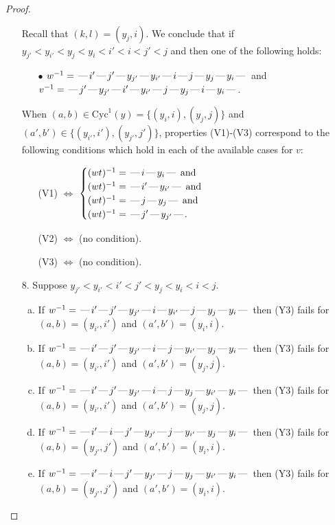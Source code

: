\documentclass[10pt]{article}
\theoremstyle{definition}
\theoremstyle{definition}
\def\dash{\text{\hspace{0.5mm}---\hspace{0.5mm}}}
\def\Cyc{\mathrm{Cyc}}
\begin{document}
\begin{proof}
\begin{enumerate}
\begin{enumerate}[(a)]
\end{enumerate}
Recall that $(k,l) = (y_j,i)$.
We conclude that if $y_{j'} < y_{i'} < y_j < y_i < i' < i < j' < j$ and then one of the following holds:
\begin{enumerate}
\item[$\bullet$] $w^{-1} = \dash i'\dash j'\dash y_{j'}\dash y_{i'}\dash i\dash j\dash y_j\dash y_i\dash $ and $v^{-1} = \dash j'\dash y_{j'}\dash i'\dash y_{i'}\dash j\dash y_j\dash i\dash y_i\dash $.
\end{enumerate}
When $(a,b)\in\Cyc^1(y)=\{(y_i,i),(y_j,j)\}$ and $(a',b')\in\{(y_{i'},i'),(y_{j'},j')\}$,
properties (V1)-(V3) correspond to the following conditions which hold in
each of the available cases for $v$:
\begin{enumerate}
\item[](V1) $\Leftrightarrow$ $\begin{cases}\text{$(wt)^{-1} = \dash i \dash y_i \dash$}\text{ and }\\
\text{$(wt)^{-1} = \dash i' \dash y_{i'} \dash$}\text{ and }\\
\text{$(wt)^{-1} = \dash j \dash y_j \dash$}\text{ and }\\
\text{$(wt)^{-1} = \dash j' \dash y_{j'} \dash$}.\end{cases}$
\item[](V2) $\Leftrightarrow$ (no condition).
\item[](V3) $\Leftrightarrow$ (no condition).
\end{enumerate}
\item[$8$.] Suppose $y_{j'} < y_{i'} < i' < j' < y_j < y_i < i < j$.
\begin{enumerate}[(a)]
\item If $w^{-1} = \dash i'\dash j'\dash y_{j'}\dash i\dash y_{i'}\dash j\dash y_j\dash y_i\dash $ then (Y3) fails for $(a,b)=(y_{i'},i')$ and $(a',b')=(y_i,i)$.
\item If $w^{-1} = \dash i'\dash j'\dash y_{j'}\dash i\dash j\dash y_{i'}\dash y_j\dash y_i\dash $ then (Y3) fails for $(a,b)=(y_{i'},i')$ and $(a',b')=(y_j,j)$.
\item If $w^{-1} = \dash i'\dash j'\dash y_{j'}\dash i\dash j\dash y_j\dash y_{i'}\dash y_i\dash $ then (Y3) fails for $(a,b)=(y_{i'},i')$ and $(a',b')=(y_j,j)$.
\item If $w^{-1} = \dash i'\dash i\dash j'\dash y_{j'}\dash j\dash y_{i'}\dash y_j\dash y_i\dash $ then (Y3) fails for $(a,b)=(y_{j'},j')$ and $(a',b')=(y_i,i)$.
\item If $w^{-1} = \dash i'\dash i\dash j'\dash y_{j'}\dash j\dash y_j\dash y_{i'}\dash y_i\dash $ then (Y3) fails for $(a,b)=(y_{j'},j')$ and $(a',b')=(y_i,i)$.

\end{enumerate}
\end{enumerate}
\end{proof}
\end{document}
